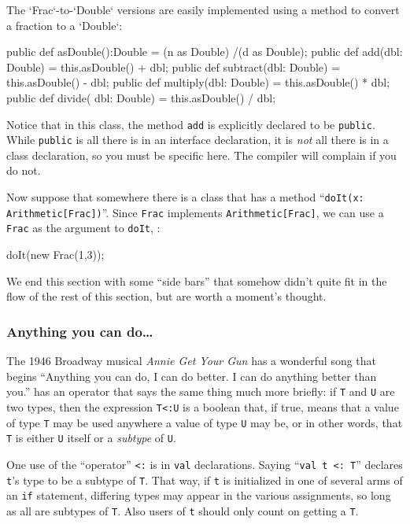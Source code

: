 The \xcd`Frac`-to-\xcd`Double` versions are easily implemented using 
a method to convert a fraction to a \xcd`Double`: 

\begin{xtennum}[]
public def asDouble():Double = (n as Double) /(d as Double);
public def add(dbl: Double) = this.asDouble() + dbl;
public def subtract(dbl: Double) = this.asDouble() - dbl;
public def multiply(dbl: Double) = this.asDouble() * dbl;
public def divide(  dbl: Double) = this.asDouble() / dbl;
\end{xtennum}


Notice that in this class, the method {\tt add} is explicitly declared to be
{\tt public}.  While {\tt public} is all there is in an interface declaration,
it is {\em not} all there is in a class declaration, so you must be specific
here.  The compiler will complain if you do not.

Now suppose that somewhere there is a class that has a method ``{\tt doIt(x:
Arith\-me\-tic[Frac])}''. Since {\tt Frac} implements {\tt Arithmetic[Frac]},
we can use a {\tt Frac} as the argument to {\tt doIt}, \eg:

\begin{xtennum}[]
doIt(new Frac(1,3));
\end{xtennum}



We end this section with some ``side bars'' that somehow didn't quite fit in 
the flow of the rest of this section, but are worth a moment's thought.

\subsubsection{ Anything you can do\ldots}\label{subsub:type:anything}
The 1946 Broadway musical {\em Annie Get Your
Gun} has a wonderful song that begins ``Anything you can do, I can do better. 
I can do anything better than you.''  \Xten{} has an operator that says the
same thing much more briefly: if {\tt T} and {\tt U} are two types, then the
expression {\tt T<:U} is a boolean that, if true, means that a value of type
{\tt T} may be used anywhere a value of type {\tt U} may be, or in other words,
that {\tt T} is either {\tt U} itself or a {\em subtype} of {\tt U}. 

One use of the ``operator'' {\tt <:} is in {\tt val} declarations. 
Saying ``{\tt val t <: T}'' declares {\tt t}'s type to be a subtype of {\tt T}. 
That way, if {\tt t} is initialized in one of several arms of an {\tt if}
statement, differing types may appear in the various assignments, so long as all
are subtypes of {\tt T}.  Also users of {\tt t} should only count on getting a
{\tt T}.

